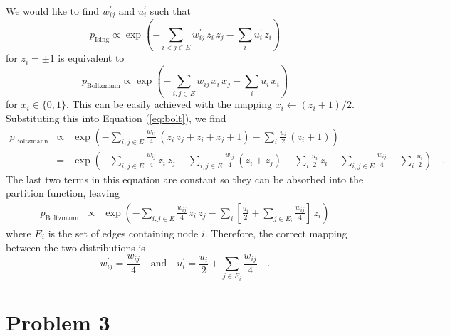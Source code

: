 \documentclass[11pt]{article}
\newcommand{\eq}[1]{Equation (\ref{eq:#1})}
\newcommand{\eqlabel}[1]{\label{eq:#1}}
\begin{document}
We would like to find $w_{ij}^\prime$ and $u_i^\prime$ such that
\begin{equation}
    p_\mathrm{Ising} \propto \exp \left ( - \sum_{i<j\in E}
        w_{ij}^\prime \, z_i\, z_j - \sum_i u_i^\prime \, z_i \right )
\end{equation}
for $z_i = \pm 1$ is equivalent to
\begin{equation}\eqlabel{bolt}
    p_\mathrm{Boltzmann} \propto \exp \left ( - \sum_{i,j\in E}
        w_{ij} \, x_i\, x_j - \sum_i u_i \, x_i \right )
\end{equation}
for $x_i \in \{0,1\}$. This can be easily achieved with the mapping
$x_i \gets (z_i + 1)/2$. Substituting this into \eq{bolt}, we find
\begin{eqnarray}
    p_\mathrm{Boltzmann} &\propto& \exp \left ( - \sum_{i,j\in E}
    \frac{w_{ij}}{4} \, (z_i\, z_j + z_i + z_j + 1)
    - \sum_i \frac{u_i}{2} \, (z_i+1) \right )\\
    &=& \exp \left ( - \sum_{i,j\in E}
    \frac{w_{ij}}{4} \, z_i\, z_j - \sum_{i,j\in E}
    \frac{w_{ij}}{4} \, (z_i+z_j)
    - \sum_i \frac{u_i}{2} \, z_i - \sum_{i,j\in E} \frac{w_{ij}}{4}
    - \sum_i \frac{u_i}{2} \right ) \quad .
\end{eqnarray}
The last two terms in this equation are constant so they can be absorbed into
the partition function, leaving
\begin{eqnarray}
    p_\mathrm{Boltzmann} &\propto& \exp \left ( - \sum_{i,j\in E}
    \frac{w_{ij}}{4} \, z_i\, z_j
    - \sum_i \left [ \frac{u_i}{2} + \sum_{j\in E_i} \frac{w_{ij}}{4} \right ]
        \, z_i \right )
\end{eqnarray}
where $E_i$ is the set of edges containing node $i$. Therefore, the correct
mapping between the two distributions is
\begin{equation}
    w_{ij}^\prime = \frac{w_{ij}}{4} \quad \mathrm{and} \quad
    u_i^\prime = \frac{u_i}{2} + \sum_{j\in E_i} \frac{w_{ij}}{4} \quad .
\end{equation}


\section{Problem 3}
\end{document}
